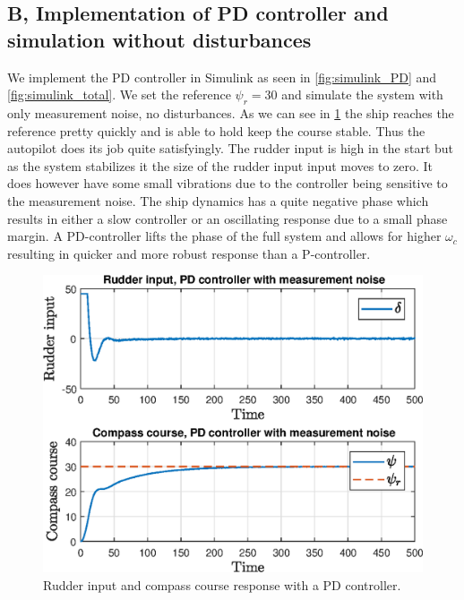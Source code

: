 \subsection{B, Implementation of PD controller and simulation without disturbances}
We implement the PD controller in Simulink as seen in \cref{fig:simulink_PD} and \cref{fig:simulink_total}. We set the reference $\psi_r = 30$ and simulate the system with only measurement noise, no disturbances. As we can see in \cref{fig:p3pb_rudder_heading} the ship reaches the reference pretty quickly and is able to hold keep the course stable. Thus the autopilot does its job quite satisfyingly. The rudder input is high in the start but as the system stabilizes it the size of the rudder input input moves to zero. It does however have some small vibrations due to the controller being sensitive to the measurement noise. The ship dynamics has a quite negative phase which results in either a slow controller or an oscillating response due to a small phase margin. A PD-controller lifts the phase of the full system and allows for higher $\omega_c$ resulting in quicker and more robust response than a P-controller. 
\begin{figure}
    \centering
    \includegraphics[width = 1.00\textwidth]{figures/plots/P5p3b_rudder_heading.eps}
    \caption{Rudder input and compass course response with a PD controller.}
    \label{fig:p3pb_rudder_heading}
\end{figure}
